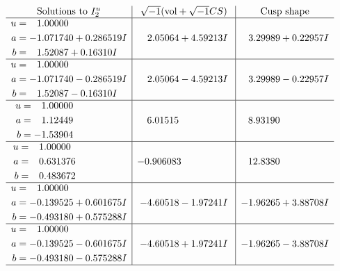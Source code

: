\documentclass[1p]{elsarticle_modified}
\theoremstyle{definition}
\newcommand{\I}{\sqrt{-1}}
\begin{document}
$$\begin{array}{c|c|c}  
\text{Solutions to }I^u_{2}& \I (\text{vol} + \sqrt{-1}CS) & \text{Cusp shape}\\
 \hline 
\begin{aligned}
u &= \phantom{-}1.00000\phantom{ +0.000000I} \\
a &= -1.071740 + 0.286519 I \\
b &= \phantom{-}1.52087 + 0.16310 I\end{aligned}
 & \phantom{-}2.05064 + 4.59213 I & \phantom{-}3.29989 + 0.22957 I \\ \hline\begin{aligned}
u &= \phantom{-}1.00000\phantom{ +0.000000I} \\
a &= -1.071740 - 0.286519 I \\
b &= \phantom{-}1.52087 - 0.16310 I\end{aligned}
 & \phantom{-}2.05064 - 4.59213 I & \phantom{-}3.29989 - 0.22957 I \\ \hline\begin{aligned}
u &= \phantom{-}1.00000\phantom{ +0.000000I} \\
a &= \phantom{-}1.12449\phantom{ +0.000000I} \\
b &= -1.53904\phantom{ +0.000000I}\end{aligned}
 & \phantom{-}6.01515\phantom{ +0.000000I} & \phantom{-}8.93190\phantom{ +0.000000I} \\ \hline\begin{aligned}
u &= \phantom{-}1.00000\phantom{ +0.000000I} \\
a &= \phantom{-}0.631376\phantom{ +0.000000I} \\
b &= \phantom{-}0.483672\phantom{ +0.000000I}\end{aligned}
 & -0.906083\phantom{ +0.000000I} & \phantom{-}12.8380\phantom{ +0.000000I} \\ \hline\begin{aligned}
u &= \phantom{-}1.00000\phantom{ +0.000000I} \\
a &= -0.139525 + 0.601675 I \\
b &= -0.493180 + 0.575288 I\end{aligned}
 & -4.60518 - 1.97241 I & -1.96265 + 3.88708 I \\ \hline\begin{aligned}
u &= \phantom{-}1.00000\phantom{ +0.000000I} \\
a &= -0.139525 - 0.601675 I \\
b &= -0.493180 - 0.575288 I\end{aligned}
 & -4.60518 + 1.97241 I & -1.96265 - 3.88708 I\\
 \hline 
 \end{array}$$\newpage\newpage\renewcommand{\arraystretch}{1}
\end{document}
